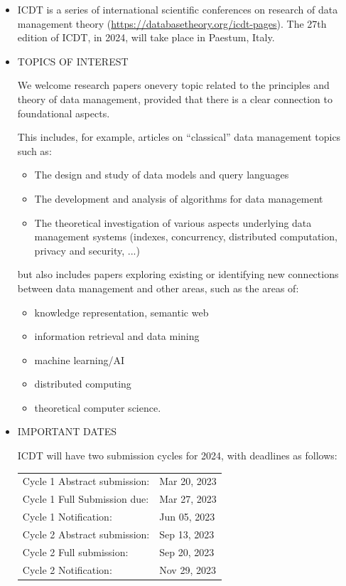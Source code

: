 \documentclass[prodmode,acmtecs]{acmsmall} %
\begin{document}
\begin{itemize}\item  ICDT is a series of international scientific conferences on research of data management theory (\href{https://databasetheory.org/icdt-pages}{https://databasetheory.org/icdt-pages}). The 27th edition of ICDT, in 2024, will take place in Paestum, Italy. 
 
\item  TOPICS OF INTEREST 
 
    We welcome research papers onevery topic related to the principles and theory of data management, provided that there is a clear connection to foundational aspects. 
 
  This includes, for example, articles on ``classical'' data management topics such as: 
 
\begin{itemize}\item  The design and study of data models and query languages
\item  The development and analysis of algorithms for data management
\item  The theoretical investigation of various aspects underlying data management systems (indexes, concurrency, distributed computation, privacy and security, ...)
\end{itemize} 
  but also includes papers exploring existing or identifying new connections between data management and other areas, such as the areas of: 
 
\begin{itemize}\item  knowledge representation, semantic web
\item  information retrieval and data mining
\item  machine learning/AI
\item  distributed computing
\item  theoretical computer science.
\end{itemize} 
\item  IMPORTANT DATES  
 
  ICDT will have two submission cycles for 2024, with deadlines as follows: 
 
\begin{tabulary}{\linewidth}{LL}Cycle 1 Abstract submission:  & Mar 20, 2023 \\
Cycle 1 Full Submission due:  & Mar 27, 2023 \\
Cycle 1 Notification:  & Jun 05, 2023 \\
Cycle 2 Abstract submission:  & Sep 13, 2023 \\
Cycle 2 Full submission:  & Sep 20, 2023 \\
Cycle 2 Notification:  & Nov 29, 2023 \\
\end{tabulary}
 

\end{itemize}
\end{document}
